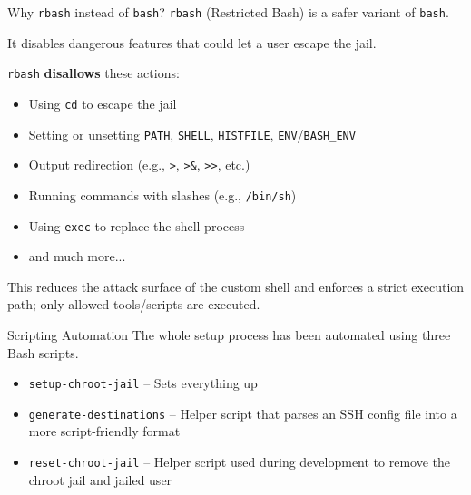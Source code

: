 \documentclass[14pt,compress,dvipsnames,aspectratio=169]{beamer} %
\begin{document}
\begin{frame}{Why \texttt{rbash} instead of \texttt{bash}?}
    \texttt{rbash} (Restricted Bash) is a safer variant of \texttt{bash}.  

    It disables dangerous features that could let a user escape the jail.  

    \texttt{rbash} \textbf{disallows} these actions:
    \begin{itemize}
        \item{Using \texttt{cd} to escape the jail} 
        \item{Setting or unsetting \texttt{PATH}, \texttt{SHELL}, \texttt{HISTFILE}, \texttt{ENV}/\texttt{BASH\_ENV} }
        \item{Output redirection (e.g., \texttt{>}, \texttt{>\&}, \texttt{>>}, etc.)} 
        \item{Running commands with slashes (e.g., \texttt{/bin/sh})} 
        \item{Using \texttt{exec} to replace the shell process} 
        \item{and much more...} 
    \end{itemize}
    This reduces the attack surface of the custom shell and enforces a strict execution
    path; only allowed tools/scripts are executed.  
\end{frame}

\begin{frame}{Scripting Automation}
    The whole setup process has been automated using three Bash scripts.  
    \vspace{1.0cm}
    \begin{itemize}
        \item{\texttt{setup-chroot-jail} -- Sets everything up} 
        \vspace{1.0cm}
        \item{\texttt{generate-destinations} -- Helper script that parses an SSH
            config file into a more script-friendly format}
        \vspace{1.0cm}
        \item{\texttt{reset-chroot-jail} -- Helper script used during development to
            remove the chroot jail and jailed user}
    \end{itemize}
\end{frame}
\end{document}
